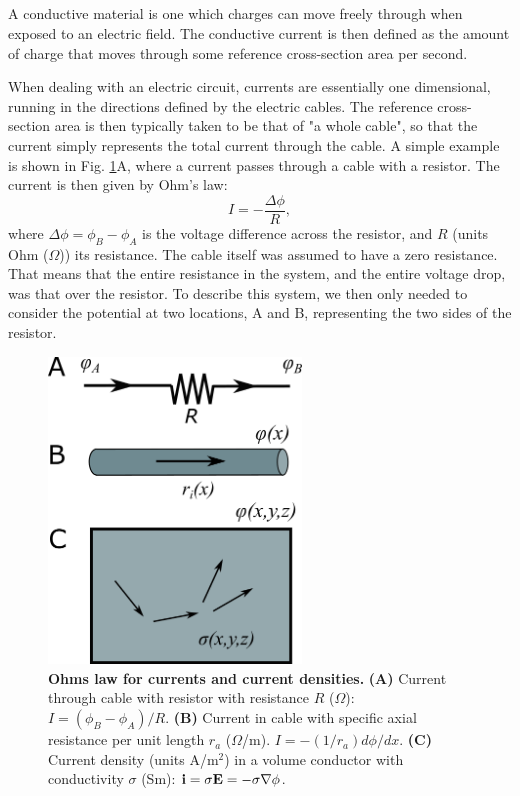 \subsection{}
A conductive material   is one which charges can move freely through when exposed to an electric field. The conductive current is then defined as the amount of charge that moves through some reference cross-section area per second. 

When dealing with an electric circuit, currents are essentially one dimensional, running in the directions defined by the electric cables. The reference cross-section area is then typically taken to be that of "a whole cable", so that the current simply represents the total current through the cable. A simple example is shown in Fig. \ref{Basics:fig:Currents}A, where a current passes through a cable with a resistor. The current is then given by Ohm's law:
\begin{equation}
I = - \frac{\Delta \phi}{R}, 
\label{Basics:eq:Ohm_R}
\end{equation}
where $\Delta \phi = \phi_B-\phi_A$ is the voltage difference across the resistor, and $R$ (units Ohm ($\Omega$)) its resistance. The cable itself was assumed to have a zero resistance. That means that the entire resistance in the system, and the entire voltage drop, was that over the resistor. To describe this system, we then only needed to consider the potential at two locations, A and B, representing the two sides of the resistor. 

\begin{figure}[!ht]
\begin{center}
\includegraphics[width=0.6\textwidth]{Figures/Basics/Currents.png}
\end{center}
\caption{{\bf Ohms law for currents and current densities.} {\bf (A)} Current through cable with resistor with resistance $R$ ($\Omega$): $I = (\phi_B-\phi_A)/R$. {\bf (B)} Current in cable with specific axial resistance per unit length $r_a$ ($\Omega$/m).  $I=- (1/r_a) d\phi/dx$. {\bf (C)} Current density (units A/m$^2$) in a volume conductor with conductivity $\sigma$ (Sm): ${\bf i} = \sigma {\bf E} = - \sigma \nabla \phi$.}
\label{Basics:fig:Currents}
\end{figure}

